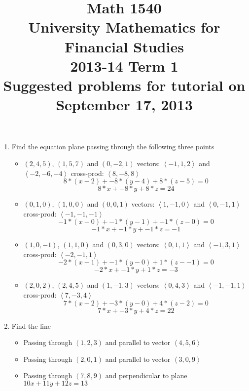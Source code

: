 \documentclass[8pt]{article} %
\title{Math 1540\\University Mathematics for Financial Studies\\2013-14 Term 1\\Suggested problems for tutorial on\\September 17, 2013}
\begin{document}
\maketitle
\begin{enumerate}
	\item{Find the equation plane passing through the following three points
		\begin{itemize}
			\item{$(2,4,5)$, $(1,5,7)$ and $(0,-2,1)$
vectors: $\left<-1,1,2\right>$ and $\left<-2,-6,-4\right>$
cross-prod: $\left<8,-8,8\right>$
\[8*(x-2)+-8*(y-4)+8*(z-5)=0\]
\[8*x+-8*y+8*z=24\]
				}
			\item{$(0,1,0)$, $(1,0,0)$ and $(0,0,1)$
vectors: $\left<1,-1,0\right>$ and $\left<0,-1,1\right>$
cross-prod: $\left<-1,-1,-1\right>$
\[-1*(x-0)+-1*(y-1)+-1*(z-0)=0\]
\[-1*x+-1*y+-1*z=-1\]
				}
			\item{$(1,0,-1)$, $(1,1,0)$ and $(0,3,0)$
vectors: $\left<0,1,1\right>$ and $\left<-1,3,1\right>$
cross-prod: $\left<-2,-1,1\right>$
\[-2*(x-1)+-1*(y-0)+1*(z--1)=0\]
\[-2*x+-1*y+1*z=-3\]
				}
			\item{$(2,0,2)$, $(2,4,5)$ and $(1,-1,3)$
vectors: $\left<0,4,3\right>$ and $\left<-1,-1,1\right>$
cross-prod: $\left<7,-3,4\right>$
\[7*(x-2)+-3*(y-0)+4*(z-2)=0\]
\[7*x+-3*y+4*z=22\]
				}
		\end{itemize}
		}%
	\item{Find the line
		\begin{itemize}
			\item{Passing through $(1,2,3)$ and parallel to vector $\left<4,5,6\right>$}
			\item{Passing through $(2,0,1)$ and parallel to vector $\left<3,0,9\right>$}
			\item{Passing through $(7,8,9)$ and perpendicular to plane $10x+11y+12z=13$}
		\end{itemize}
		}%
\end{enumerate}
\end{document}
